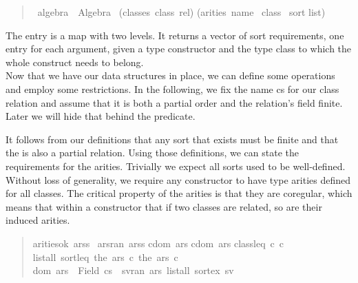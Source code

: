 \begin{quote}
    \begin{isabelle}
        \ algebra\ {\isacharequal}\ Algebra\ \isanewline
        \isaindent{\ \ }(classes{\isacharcolon}\ class\ rel)\isanewline
        \isaindent{\ \ }(arities{\isacharcolon}\ name \isasymrightharpoonup\ class \isasymrightharpoonup\ sort list)
    \end{isabelle}
\end{quote}

The  entry is a map with two levels.
It returns a vector of sort requirements, one entry for each argument, given a type constructor and the type class to which the whole construct needs to belong.\\
Now that we have our data structures in place, we can define some operations and employ some restrictions.
In the following, we fix the name cs for our class relation and assume that it is both a partial order and the relation's field finite.
Later we will hide that behind the  predicate.


It follows from our definitions that any sort that exists must be finite and that the  is also a partial relation.
Using those definitions, we can state the requirements for the arities.
Trivially we expect all sorts used to be well-defined.
Without loss of generality, we require any constructor to have type arities defined for all classes.
The critical property of the arities is that they are coregular, which means that within a constructor that if two classes are related, so are their induced arities.

\begin{quote}
\begin{isabelle}
 arities{\isacharunderscore}ok\ arss\ {\isacharequal}\isanewline
{\isacharparenleft}{\isasymforall}ars{\isasymin}ran\ arss{\isachardot}\isanewline
\isaindent{{\isacharparenleft}\ \ \ }{\isacharparenleft}{\isasymforall}cdom\ ars{\isachardot}\isanewline
\isaindent{{\isacharparenleft}\ \ \ {\isacharparenleft}\ \ \ }{\isasymforall}cdom\ ars{\isachardot}\isanewline
\isaindent{{\isacharparenleft}\ \ \ {\isacharparenleft}\ \ \ \ \ \ }class{\isacharunderscore}leq\ c\ c\ {\isasymlongrightarrow}\isanewline
\isaindent{{\isacharparenleft}\ \ \ {\isacharparenleft}\ \ \ \ \ \ }list{\isacharunderscore}all{}\ sort{\isacharunderscore}leq\ {\isacharparenleft}the\ {\isacharparenleft}ars\ c\ {\isacharparenleft}the\ {\isacharparenleft}ars\ c\ {\isasymand}\isanewline
\isaindent{{\isacharparenleft}\ \ \ }dom\ ars\ {\isacharequal}\ Field\ cs\ {\isasymand}\ {\isacharparenleft}{\isasymforall}sv{\isasymin}ran\ ars{\isachardot}\ list{\isacharunderscore}all\ sort{\isacharunderscore}ex\ sv{\isacharparenright}{\isacharparenright}%
\end{isabelle}
\end{quote}

